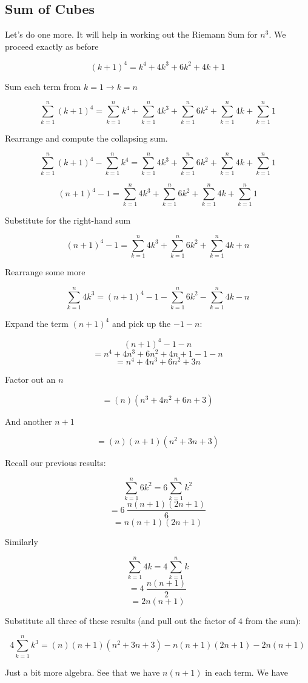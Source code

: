 \documentclass[11pt, oneside]{article}
\begin{document}
\subsection*{Sum of Cubes}

Let's do one more.  It will help in working out the Riemann Sum for $n^3$.  We proceed exactly as before

\[ (k+1)^4 = k^4 + 4k^3 + 6k^2 + 4k + 1 \]

Sum each term from $k=1 \rightarrow k=n$

\[ \sum_{k=1}^n (k+1)^4 = \sum_{k=1}^n k^4 + \sum_{k=1}^n 4k^3 + \sum_{k=1}^n 6k^2 + \sum_{k=1}^n 4k + \sum_{k=1}^n 1 \]

Rearrange and compute the collapsing sum.

\[ \sum_{k=1}^n (k+1)^4 - \sum_{k=1}^n k^4 = \sum_{k=1}^n 4k^3 + \sum_{k=1}^n 6k^2 + \sum_{k=1}^n 4k + \sum_{k=1}^n 1 \]

\[ (n+1)^4 - 1 = \sum_{k=1}^n 4k^3 + \sum_{k=1}^n 6k^2 + \sum_{k=1}^n 4k + \sum_{k=1}^n 1 \]

Substitute for the right-hand sum

\[ (n+1)^4 - 1 = \sum_{k=1}^n 4k^3 + \sum_{k=1}^n 6k^2 + \sum_{k=1}^n 4k + n \]

Rearrange some more

\[ \sum_{k=1}^n 4k^3 = (n+1)^4 - 1 - \sum_{k=1}^n 6k^2 - \sum_{k=1}^n 4k - n \]

Expand the term $(n+1)^4$ and pick up the $-1 - n$:

\[ (n+1)^4 - 1 - n \]
\[ = n^4 + 4n^3 + 6n^2 + 4n + 1 - 1 - n \]
\[ =  n^4 + 4n^3 + 6n^2 + 3n  \]

Factor out an $n$

\[ = (n)(n^3 + 4n^2 + 6n + 3) \]

And another $n+1$

\[ = (n)(n+1)(n^2 + 3n + 3) \]

Recall our previous results:

\[ \sum_{k=1}^n 6k^2 = 6 \sum_{k=1}^n k^2 \]
\[ = 6 \ \frac{n(n+1)(2n+1)}{6}  \] 
\[ = n(n+1)(2n+1) \] 

Similarly

\[ \sum_{k=1}^n 4k = 4 \sum_{k=1}^n k \]
\[ = 4 \ \frac{n(n+1)}{2} \]
\[ = 2 n(n+1) \]

Substitute all three of these results (and pull out the factor of $4$ from the sum):

\[ 4\sum_{k=1}^n k^3 = (n)(n+1)(n^2 + 3n + 3) - n(n+1)(2n+1) -  2 n(n+1) \] 

Just a bit more algebra.  See that we have $n(n+1)$ in each term.  We have
\end{document}
